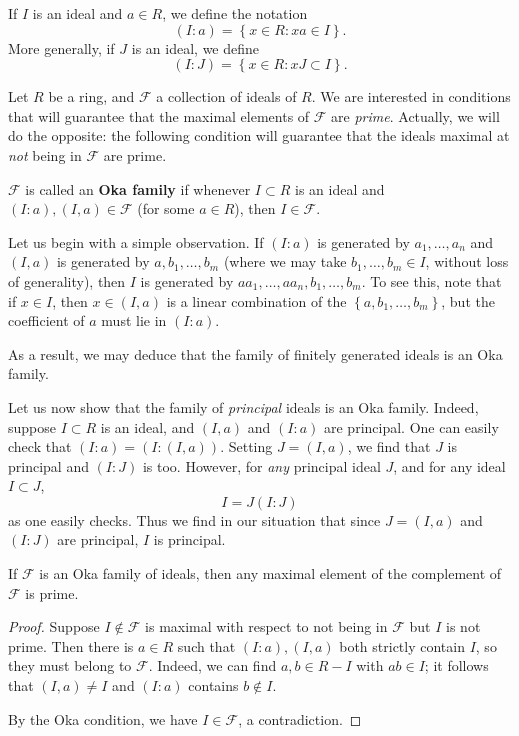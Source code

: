 If $I$ is an ideal and $a \in R$, we define the notation
\[ (I:a) = \left\{ x\in R: xa \in I\right\} . \]
More generally, if $J$ is an ideal, we define
\[ (I:J) = \left\{x \in R: xJ \subset I\right\} . \]

Let $R$ be a ring, and $\mathcal{F}$ a collection of ideals of $R$. 
We are interested in conditions that will guarantee that the maximal elements
of $\mathcal{F}$ are \emph{prime}.
Actually, we will do the opposite: the following condition will guarantee that
the ideals maximal at \emph{not} being in $\mathcal{F}$ are prime. 

\begin{definition} \label{okafamily}
$\mathcal{F}$ is called an \textbf{Oka family} if whenever $I \subset R$ is an
ideal and $(I:a), (I,a) \in \mathcal{F}$ (for some $a \in R$), then $I \in
\mathcal{F}$.
\end{definition} 

\begin{example} 
Let us begin with a simple observation. If $(I:a)$ is generated by
$a_1, \dots, a_n$ and $(I,a)$ is generated by $a, b_1, \dots, b_m$ (where we
may take
$b_1, \dots, b_m \in I$, without loss of generality), then $I$
is generated by $aa_1, \dots, aa_n, b_1, \dots, b_m$.
To see this, note that if $x \in I$, then $x \in (I,a)$ is a linear combination 
of the $\left\{a, b_1, \dots, b_m\right\}$, but the coefficient of $a$ must
lie in $(I:a)$.

As a result, we may deduce that
the family of finitely generated ideals is an Oka family.
\end{example} 

\begin{example} 
Let us now show that the family of \emph{principal} ideals is an Oka family.
Indeed, suppose $I \subset R$ is an ideal, and $(I,a)$ and $(I:a)$ are
principal.
One can easily check that
$(I:a) = (I: (I, a))$.
Setting $J = (I,a)$, we find that $J$ is principal and $(I:J)$ is too.
However, for \emph{any} principal ideal $J$, and for any ideal $I \subset J$,
\[ I = J (I: J)  \]
as one easily checks. Thus we find in our situation that since $J=(I,a)$ and $(I:J)$
are principal, $I$ is principal.
\end{example} 

\begin{proposition}\label{okathm} If $\mathcal{F}$ is an Oka family of
ideals, then any maximal element of the complement of $\mathcal{F}$ is prime.
\end{proposition} 
\begin{proof} 
Suppose $I \notin \mathcal{F}$ is maximal with respect 
to not being in $\mathcal{F}$
but $I$ is  not prime.
Then there is $a \in R$ such that $(I:a), (I,a)$ both strictly contain $I$,
so they must belong to $\mathcal{F}$.
Indeed, we can find $a,b \in R - I$ with $ab \in I$; it follows that $(I,a)
\neq I$ and $(I:a)$ contains $b \notin I$.

By the Oka condition, we have $I \in
\mathcal{F}$, a contradiction.
\end{proof} 

